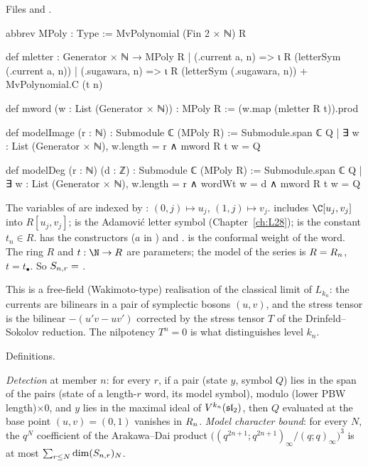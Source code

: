 \noindent Files  and
.
\begin{leancode}
abbrev MPoly : Type := MvPolynomial (Fin 2 × ℕ) R

def mletter : Generator × ℕ → MPoly R
  | (.current a, n) => ι R (letterSym (.current a, n))
  | (.sugawara, n) => ι R (letterSym (.sugawara, n)) + MvPolynomial.C (t n)

def mword (w : List (Generator × ℕ)) : MPoly R := (w.map (mletter R t)).prod

def modelImage (r : ℕ) : Submodule ℂ (MPoly R) :=
  Submodule.span ℂ {Q | ∃ w : List (Generator × ℕ), w.length = r ∧ mword R t w = Q}

def modelDeg (r : ℕ) (d : ℤ) : Submodule ℂ (MPoly R) :=
  Submodule.span ℂ
    {Q | ∃ w : List (Generator × ℕ), w.length = r ∧ wordWt w = d ∧ mword R t w = Q}
\end{leancode}

\begin{dictionary}
The variables of  are indexed by : $(0,j)\mapsto u_j$, $(1,j)\mapsto v_j$. 
includes $\C[u_j,v_j]$ into $R[u_j,v_j]$;  is the Adamovi\'c letter symbol (Chapter~\ref{ch:L28});
 is the constant $t_n\in R$.  has the constructors 
($a$ in ) and .  is the conformal weight of the word. The ring $R$ and
$t:\N\to R$ are parameters; the model of the series is $R=R_n$, $t=t_\bullet$. So
$S_{n,r}=$ .
\end{dictionary}

\begin{physics}
This is a free-field (Wakimoto-type) realisation of the classical limit of $L_{k_n}$: the currents are bilinears in a
pair of symplectic bosons $(u,v)$, and the stress tensor is the bilinear $-(u'v-uv')$ corrected by the stress tensor
$T$ of the Drinfeld--Sokolov reduction. The nilpotency $T^n=0$ is what distinguishes level $k_n$.
\end{physics}

\begin{status}
Definitions.
\end{status}

\begin{definition}\label{l29:def:detect}
\emph{Detection} at member $n$: for every $r$, if a pair (state $y$, symbol $Q$) lies in the span of the pairs
(state of a length-$r$ word, its model symbol), modulo (lower PBW length)$\times0$, and $y$ lies in the maximal ideal of
$V^{k_n}(\mathfrak{sl}_2)$, then $Q$ evaluated at the base point $(u,v)=(0,1)$ vanishes in $R_n$.
\emph{Model character bound}: for every $N$, the $q^N$ coefficient of the Arakawa--Dai product
$\bigl((q^{2n+1};q^{2n+1})_\infty/(q;q)_\infty\bigr)^3$ is at most $\sum_{r\le N}\dim(S_{n,r})_N$.
\end{definition}

